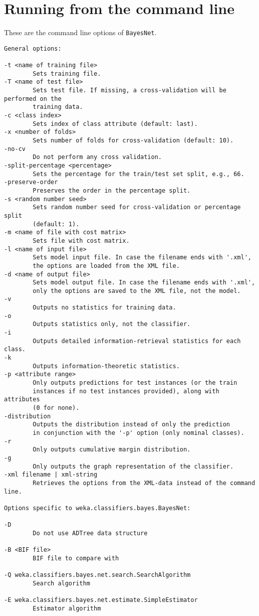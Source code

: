 \documentclass[a4paper]{article}
\begin{document}
\begin{center}
\end{center}

\section{Running from the command line}
These are the command line options of {\tt BayesNet}.

{\small
\begin{verbatim}
General options:

-t <name of training file>
        Sets training file.
-T <name of test file>
        Sets test file. If missing, a cross-validation will be performed on the 
        training data.
-c <class index>
        Sets index of class attribute (default: last).
-x <number of folds>
        Sets number of folds for cross-validation (default: 10).
-no-cv
        Do not perform any cross validation.
-split-percentage <percentage>
        Sets the percentage for the train/test set split, e.g., 66.
-preserve-order
        Preserves the order in the percentage split.
-s <random number seed>
        Sets random number seed for cross-validation or percentage split
        (default: 1).
-m <name of file with cost matrix>
        Sets file with cost matrix.
-l <name of input file>
        Sets model input file. In case the filename ends with '.xml',
        the options are loaded from the XML file.
-d <name of output file>
        Sets model output file. In case the filename ends with '.xml',
        only the options are saved to the XML file, not the model.
-v
        Outputs no statistics for training data.
-o
        Outputs statistics only, not the classifier.
-i
        Outputs detailed information-retrieval statistics for each class.
-k
        Outputs information-theoretic statistics.
-p <attribute range>
        Only outputs predictions for test instances (or the train
        instances if no test instances provided), along with attributes
        (0 for none).
-distribution
        Outputs the distribution instead of only the prediction
        in conjunction with the '-p' option (only nominal classes).
-r
        Only outputs cumulative margin distribution.
-g
        Only outputs the graph representation of the classifier.
-xml filename | xml-string
        Retrieves the options from the XML-data instead of the command line.

Options specific to weka.classifiers.bayes.BayesNet:

-D
        Do not use ADTree data structure

-B <BIF file>
        BIF file to compare with

-Q weka.classifiers.bayes.net.search.SearchAlgorithm
        Search algorithm

-E weka.classifiers.bayes.net.estimate.SimpleEstimator
        Estimator algorithm
        
\end{verbatim}
}
\end{document}
